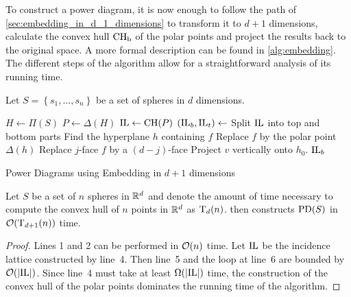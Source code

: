 To construct a power diagram, it is now enough to follow the path of \cref{sec:embedding_in_d_1_dimensions} to transform it to $d+1$ dimensions, calculate the convex hull $\operatorname{CH_b}$ of the polar points and project the results back to the original space.
A more formal description can be found in \cref{alg:embedding}.
The different steps of the algorithm allow for a straightforward analysis of its running time.
\begin{algorithm}[tb]
    Let $S = \left\{ s_1, \dots, s_n \right\}$ be a set of spheres in $d$ dimensions.

    \begin{algorithmic}[1]
            \State $H \gets \Pi(S)$
            \State $P \gets \Delta(H)$
            \Statex
            \State $\operatorname{IL} \gets \operatorname{CH}(P)$
            \State $(\operatorname{IL}_b, \operatorname{IL}_t) \gets$ Split $\operatorname{IL}$ into top and bottom parts
                    \State Find the hyperplane $h$ containing $f$
                    \State Replace $f$ by the polar point $\Delta(h)$
                \Else
                    \State Replace $j$-face $f$ by a $(d-j)$-face
                \EndIf
            \EndFor
            \Statex
                \State Project $v$ vertically onto $h_0$.
            \EndFor
            \State \Return $\operatorname{IL}_b$
        \EndFunction
    \end{algorithmic}
    \caption{Power Diagrams using Embedding in $d+1$ dimensions}
    \label{alg:embedding}
\end{algorithm}

\begin{theorem}
    Let $S$ be a set of $n$ spheres in $\mathbb{R}^d$ and denote the amount of time necessary to compute the convex hull of $n$ points in $\mathbb{R}^{d}$ as $\operatorname{T}_d(n)$.
     then constructs $\operatorname{PD}(S)$ in $\mathcal{O}(\operatorname{T}_{d+1}(n))$ time.
\end{theorem}
\begin{proof}
Lines 1 and 2 can be performed in $\mathcal{O}(n)$ time.
Let $\operatorname{IL}$ be the incidence lattice constructed by line~4.
Then line~5 and the loop at line~6 are bounded by $\mathcal{O}(\left\vert \operatorname{IL} \right\vert)$.
Since line~4 must take at least $\Omega(\left\vert \operatorname{IL} \right\vert)$ time, the construction of the convex hull of the polar points dominates the running time of the algorithm.
\end{proof}

